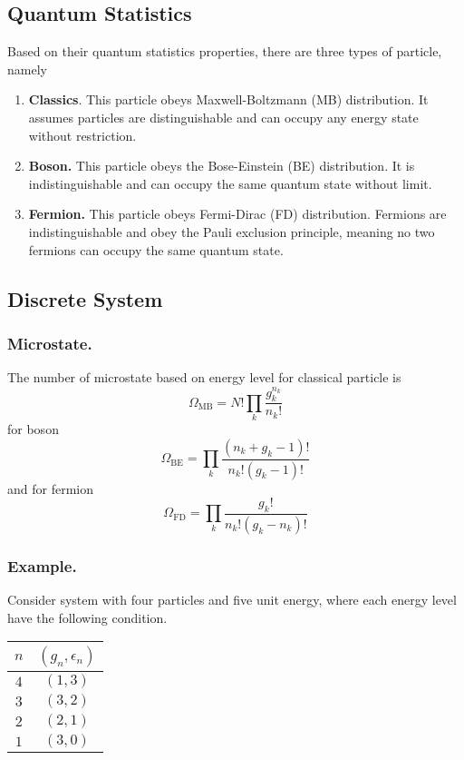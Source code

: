 \documentclass[../../../Main.tex]{subfiles}
\begin{document}
\subsection*{Quantum Statistics}
Based on their quantum statistics properties, there are three types of particle, namely 
\begin{enumerate}
    \item \textbf{Classics}. This particle obeys Maxwell-Boltzmann (MB) distribution. It assumes particles are distinguishable and can occupy any energy state without restriction.
    \item \textbf{Boson.} This particle obeys the Bose-Einstein (BE) distribution. It is indistinguishable and can occupy the same quantum state without limit.
    \item \textbf{Fermion.} This particle obeys Fermi-Dirac (FD) distribution. Fermions are indistinguishable and obey the Pauli exclusion principle, meaning no two fermions can occupy the same quantum state.
\end{enumerate}

\subsection*{Discrete System}
\subsubsection*{Microstate.} The number of microstate based on energy level for classical particle is 
\begin{equation*}
    \Omega_\text{MB}=N!\prod_k \frac{g_k^{n_k}}{n_k!}
\end{equation*}
for boson 
\begin{equation*}
    \Omega_\text{BE}=\prod_k\frac{(n_k+g_k-1)!}{n_k!(g_k-1)!}
\end{equation*}
and for fermion
\begin{equation*}
    \Omega_\text{FD}=\prod_k\frac{g_k!}{n_k!(g_k-n_k)!}
\end{equation*}

\subsubsection*{Example.} Consider system with four particles and five unit energy, where each energy level have the following condition.
\begin{table}[h]
    \centering
    \begin{tabular}{cc}
    \toprule
    $n$ & $(g_n,\epsilon_n)$\\ 
    \midrule
    $4$&$(1,3)$\\
    $3$&$(3,2)$\\
    $2$&$(2,1)$\\
    $1$&$(3,0)$\\
    \bottomrule
    \end{tabular}
\end{table}
    
\end{document}
